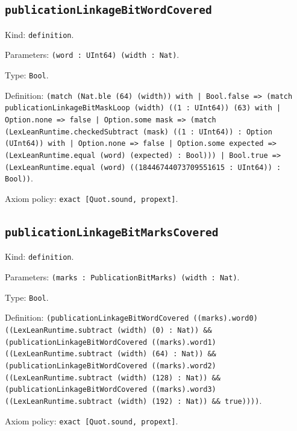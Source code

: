 \documentclass[11pt]{article}
\begin{document}
\subsection*{\texttt{publicationLinkageBitWordCovered}}
\noindent Kind: \texttt{definition}.\par
\noindent Parameters: \texttt{(word : UInt64) (width : Nat)}.\par
\noindent Type: \texttt{Bool}.\par
\noindent Definition: \texttt{(match (Nat.ble (64) (width)) with | Bool.false => (match publicationLinkageBitMaskLoop (width) ((1 : UInt64)) (63) with | Option.none => false | Option.some mask => (match (LexLeanRuntime.checkedSubtract (mask) ((1 : UInt64)) : Option (UInt64)) with | Option.none => false | Option.some expected => (LexLeanRuntime.equal (word) (expected) : Bool))) | Bool.true => (LexLeanRuntime.equal (word) ((18446744073709551615 : UInt64)) : Bool))}.\par
\noindent Axiom policy: \texttt{exact [Quot.sound, propext]}.\par
\subsection*{\texttt{publicationLinkageBitMarksCovered}}
\noindent Kind: \texttt{definition}.\par
\noindent Parameters: \texttt{(marks : PublicationBitMarks) (width : Nat)}.\par
\noindent Type: \texttt{Bool}.\par
\noindent Definition: \texttt{(publicationLinkageBitWordCovered ((marks).word0) ((LexLeanRuntime.subtract (width) (0) : Nat)) \&\& (publicationLinkageBitWordCovered ((marks).word1) ((LexLeanRuntime.subtract (width) (64) : Nat)) \&\& (publicationLinkageBitWordCovered ((marks).word2) ((LexLeanRuntime.subtract (width) (128) : Nat)) \&\& (publicationLinkageBitWordCovered ((marks).word3) ((LexLeanRuntime.subtract (width) (192) : Nat)) \&\& true))))}.\par
\noindent Axiom policy: \texttt{exact [Quot.sound, propext]}.\par
\end{document}

